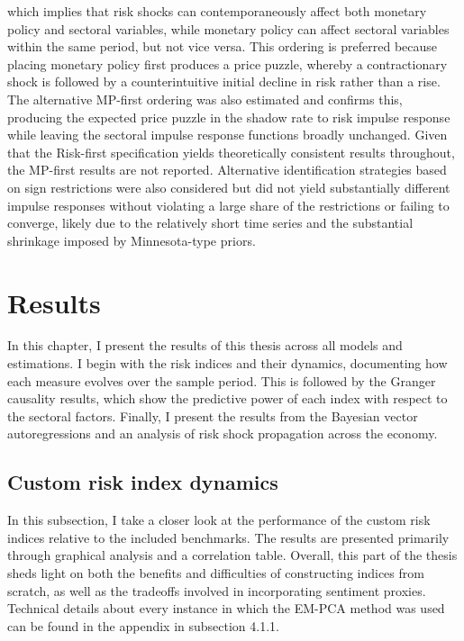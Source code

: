 \documentclass[12pt,a4paper]{report}
\begin{document}
which implies that risk shocks can contemporaneously affect both monetary policy and sectoral variables, while monetary policy can affect sectoral variables within the same period, but not vice versa. This ordering is preferred because placing monetary policy first produces a price puzzle, whereby a contractionary shock is followed by a counterintuitive initial decline in risk rather than a rise. The alternative MP-first ordering was also estimated and confirms this, producing the expected price puzzle in the shadow rate to risk impulse response while leaving the sectoral impulse response functions broadly unchanged. Given that the Risk-first specification yields theoretically consistent results throughout, the MP-first results are not reported. Alternative identification strategies based on sign restrictions were also considered but did not yield substantially different impulse responses without violating a large share of the restrictions or failing to converge, likely due to the relatively short time series and the substantial shrinkage imposed by Minnesota-type priors.



\chapter{Results}
\label{chap:results}

In this chapter, I present the results of this thesis across all models and estimations. I begin with the risk indices and their dynamics, documenting how each measure evolves over the sample period. This is followed by the Granger causality results, which show the predictive power of each index with respect to the sectoral factors. Finally, I present the results from the Bayesian vector autoregressions and an analysis of risk shock propagation across the economy.

\section{Custom risk index dynamics}
In this subsection, I take a closer look at the performance of the custom risk indices relative to the included benchmarks. The results are presented primarily through graphical analysis and a correlation table. Overall, this part of the thesis sheds light on both the benefits and difficulties of constructing indices from scratch, as well as the tradeoffs involved in incorporating sentiment proxies. Technical details about every instance in which the EM-PCA method was used can be found in the appendix in subsection 4.1.1.
\end{document}
